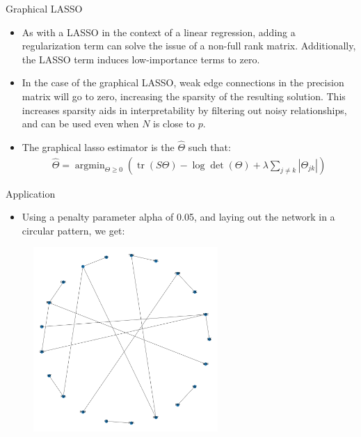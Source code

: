 \documentclass{beamer}
\begin{document}
\begin{frame}{Graphical LASSO}
  \begin{itemize}
    \item As with a LASSO in the context of a linear regression, adding a regularization term can solve the issue of a non-full rank matrix.
    Additionally, the LASSO term induces low-importance terms to zero.
    \item In the case of the graphical LASSO, weak edge connections in the precision matrix will go to zero, increasing the sparsity of the resulting solution.
    This increases sparsity aids in interpretability by filtering out noisy relationships, and can be used even when $N$ is close to $p$.
    \item The graphical lasso estimator is the $\hat{\Theta}$ such that:
\begin{align*}
    \hat{\Theta}=\operatorname{argmin}_{\Theta \geq 0}\left(\operatorname{tr}(S \Theta)-\log \operatorname{det}(\Theta)+\lambda \sum_{j \neq k}\left|\Theta_{j k}\right|\right)
\end{align*}
  \end{itemize}
\end{frame}

\begin{frame}{Application}
	\begin{itemize}
		\item Using a penalty parameter alpha of 0.05, and laying out the network in a circular pattern, we get:
	\end{itemize}
	\begin{figure}
		\includegraphics[width=7cm]{NetworkGraph_Alpha0.05_Layoutcircular.png}
		\caption{}
	\end{figure}
\end{frame}
\end{document}
